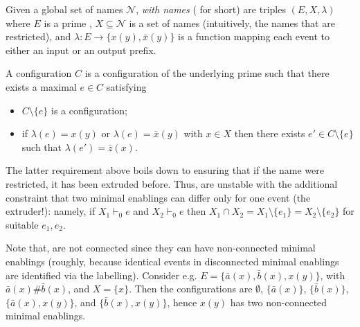 Given a global set of names $\mathcal{N}$, {\esabbr} \emph{with names}
({\esnmabbr} for short) are triples $(E, X, \lambda)$ where $E$ is a
prime {\esabbr}, $X \subseteq \mathcal{N}$ is a set of names
(intuitively, the names that are restricted), and
$\lambda : E \to \{ x(y), \bar{x}(y) \}$ is a function mapping each event
to either an input or an output prefix.

A configuration $C$ is a configuration of the underlying prime
{\esabbr} such that there exists a maximal $e \in C$
satisfying
\begin{itemize}
\item $C \setminus \{ e \}$ is a configuration;
\item if $\lambda(e) = x(y)$ or $\lambda(e) = \bar{x}(y)$ with
  $x \in X$ then there exists $e' \in C \setminus \{e\}$ such that
  $\lambda(e') = \bar{z}(x)$.
\end{itemize}

The latter requirement above boils down to ensuring that if the name were 
restricted, it has been extruded before.
% 
Thus, {\esnmabbr} are unstable {\esabbr} with the additional constraint 
that two minimal enablings can differ only for one event (the extruder!):
namely, if $X_1 \vdash_0 e$ and $X_2 \vdash_0 e$ then
$X_1 \cap X_2 = X_1 \setminus \{ e_1 \} = X_2 \setminus \{ e_2 \}$
for suitable $e_1, e_2$.

Note that, {\esnmabbr} are not connected {\esabbr} since they can have 
non-connected minimal enablings (roughly, because identical events in 
disconnected minimal enablings are identified via the labelling).
% 
Consider e.g. $E = \{ \bar{a}(x), \bar{b}(x), x(y) \}$, with
$\bar{a}(x) \# \bar{b}(x)$, and $X=\{x\}$. Then the
configurations are $\emptyset$, $\{\bar{a}(x)\}$, $\{\bar{b}(x)\}$,
$\{\bar{a}(x), x(y)\}$, and $\{\bar{b}(x), x(y)\}$, hence $x(y)$ has two
non-connected minimal enablings. 
% 




%
%
%
%


